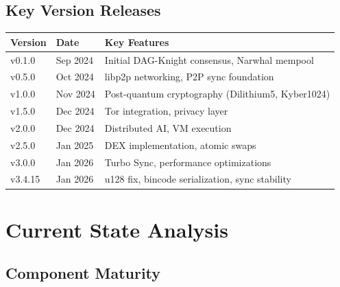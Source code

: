 \documentclass[12pt,a4paper]{article}
\begin{document}
\subsection{Key Version Releases}

\begin{center}
\begin{tabular}{@{}llp{8cm}@{}}
\toprule
\textbf{Version} & \textbf{Date} & \textbf{Key Features} \\
\midrule
v0.1.0 & Sep 2024 & Initial DAG-Knight consensus, Narwhal mempool \\
v0.5.0 & Oct 2024 & libp2p networking, P2P sync foundation \\
v1.0.0 & Nov 2024 & Post-quantum cryptography (Dilithium5, Kyber1024) \\
v1.5.0 & Dec 2024 & Tor integration, privacy layer \\
v2.0.0 & Dec 2024 & Distributed AI, VM execution \\
v2.5.0 & Jan 2025 & DEX implementation, atomic swaps \\
v3.0.0 & Jan 2026 & Turbo Sync, performance optimizations \\
v3.4.15 & Jan 2026 & u128 fix, bincode serialization, sync stability \\
\bottomrule
\end{tabular}
\end{center}

\section{Current State Analysis}

\subsection{Component Maturity}
\end{document}
